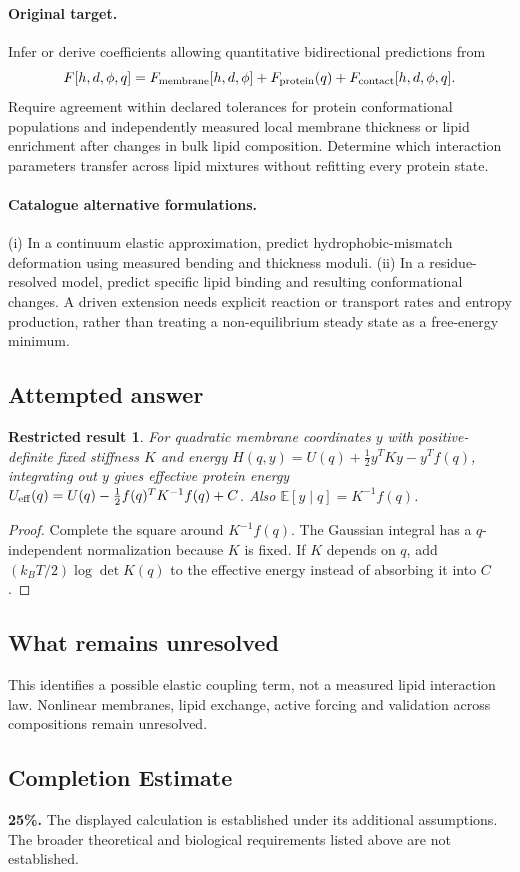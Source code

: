 \documentclass[11pt]{article}
\newcommand{\E}{\mathbb E}
\providecommand{\E}{\mathbb E}
\newtheorem{attemptresult}{Restricted result}[section]
\begin{document}
\paragraph{Original target.}
Infer or derive coefficients allowing quantitative bidirectional predictions from
\[F[h,d,\phi,q]=F_{\rm membrane}[h,d,\phi]+F_{\rm protein}(q)+F_{\rm contact}[h,d,\phi,q].\]
Require agreement within declared tolerances for protein conformational populations and independently measured local membrane thickness or lipid enrichment after changes in bulk lipid composition. Determine which interaction parameters transfer across lipid mixtures without refitting every protein state.
\paragraph{Catalogue alternative formulations.}
(i) In a continuum elastic approximation, predict hydrophobic-mismatch deformation using measured bending and thickness moduli. (ii) In a residue-resolved model, predict specific lipid binding and resulting conformational changes. A driven extension needs explicit reaction or transport rates and entropy production, rather than treating a non-equilibrium steady state as a free-energy minimum.
\subsection{Attempted answer}
\begin{attemptresult}
For quadratic membrane coordinates $y$ with positive-definite fixed stiffness $K$ and energy $H(q,y)=U(q)+\tfrac12y^TKy-y^Tf(q)$, integrating out $y$ gives effective protein energy $U_{\rm eff}(q)=U(q)-\tfrac12f(q)^TK^{-1}f(q)+C$. Also $\E[y\mid q]=K^{-1}f(q)$.
\end{attemptresult}
\begin{proof}
Complete the square around $K^{-1}f(q)$. The Gaussian integral has a $q$-independent normalization because $K$ is fixed. If $K$ depends on $q$, add $(k_BT/2)\log\det K(q)$ to the effective energy instead of absorbing it into $C$.
\end{proof}
\subsection{What remains unresolved}
This identifies a possible elastic coupling term, not a measured lipid interaction law. Nonlinear membranes, lipid exchange, active forcing and validation across compositions remain unresolved.
\subsection{Completion Estimate}
\textbf{25\%.} The displayed calculation is established under its additional assumptions. The broader theoretical and biological requirements listed above are not established.
\end{document}
